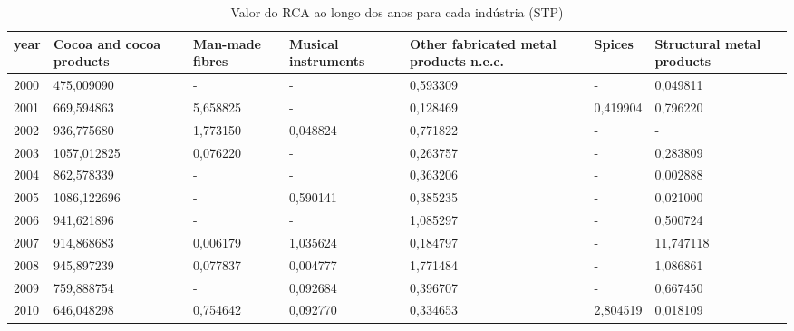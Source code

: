 \begin{table}
\centering
\caption{Valor do RCA ao longo dos anos para cada indústria (STP)}
\begin{tabular}{p{1cm}p{2cm}p{2cm}p{2cm}p{2cm}p{2cm}p{2cm}}
\toprule
 year &  Cocoa and cocoa products &  Man-made fibres &  Musical instruments &  Other fabricated metal products n.e.c. &    Spices &  Structural metal products \\
\midrule
 2000 &                475,009090 &                - &                    - &                                0,593309 &         - &                   0,049811 \\
 2001 &                669,594863 &         5,658825 &                    - &                                0,128469 &  0,419904 &                   0,796220 \\
 2002 &                936,775680 &         1,773150 &             0,048824 &                                0,771822 &         - &                          - \\
 2003 &               1057,012825 &         0,076220 &                    - &                                0,263757 &         - &                   0,283809 \\
 2004 &                862,578339 &                - &                    - &                                0,363206 &         - &                   0,002888 \\
 2005 &               1086,122696 &                - &             0,590141 &                                0,385235 &         - &                   0,021000 \\
 2006 &                941,621896 &                - &                    - &                                1,085297 &         - &                   0,500724 \\
 2007 &                914,868683 &         0,006179 &             1,035624 &                                0,184797 &         - &                  11,747118 \\
 2008 &                945,897239 &         0,077837 &             0,004777 &                                1,771484 &         - &                   1,086861 \\
 2009 &                759,888754 &                - &             0,092684 &                                0,396707 &         - &                   0,667450 \\
 2010 &                646,048298 &         0,754642 &             0,092770 &                                0,334653 &  2,804519 &                   0,018109 \\

\end{tabular}
\end{table}
